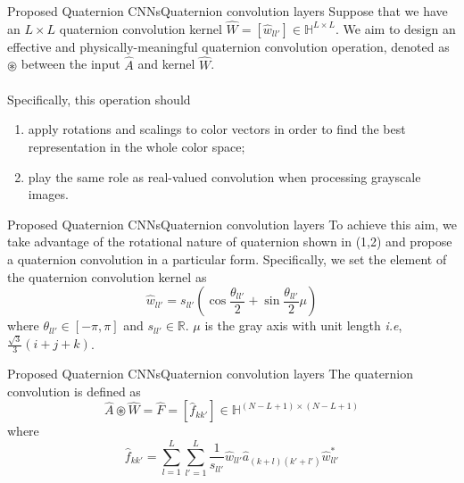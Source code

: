 \documentclass{beamer}
\begin{document}
\begin{frame}{Proposed Quaternion CNNs}{Quaternion convolution layers}
Suppose that we have an $L\times L$ quaternion convolution kernel $\hat{W}=[\hat{w}_{ll'}]\in \mathbb{H}^{L\times L}$. We aim to design an effective and physically-meaningful quaternion convolution operation, denoted as $\circledast$ between the input $\hat{A}$ and kernel $\hat{W}$.
\\~\\
Specifically, this operation should
\begin{enumerate}
    \item apply rotations and scalings to color vectors in order to find the best representation in the whole color space; 
    \item play the same role as real-valued convolution when processing grayscale images.
\end{enumerate}
\end{frame}

\begin{frame}{Proposed Quaternion CNNs}{Quaternion convolution layers}
To achieve this aim, we take advantage of the rotational nature of quaternion shown in (1,2) and propose a quaternion convolution in a particular form. Specifically, we set the element of the quaternion convolution kernel as
\begin{equation}
    \hat{w}_{ll'}=s_{ll'}(\cos\frac{\theta_{ll'}}{2}+\sin\frac{\theta_{ll'}}{2}\mu)
\end{equation}
where $\theta_{ll'}\in [-\pi,\pi]$ and $s_{ll'}\in \mathbb{R}$. $\mu$ is the gray axis with unit length \emph{i.e}, $\frac{\sqrt{3}}{3}(i+j+k)$.
\end{frame}

\begin{frame}{Proposed Quaternion CNNs}{Quaternion convolution layers}
    The quaternion convolution is defined as
    \begin{equation}
        \hat{A}\circledast \hat{W} =\hat{F}=[\hat{f}_{kk'}]\in \mathbb{H}^{(N-L+1)\times (N-L+1)}
    \end{equation}
    where 
    \begin{equation}
        \label{e6}
        \hat{f}_{kk'}=\sum_{l=1}^L\sum_{l'=1}^L \frac{1}{s_{ll'}}\hat{w}_{ll'}\hat{a}_{(k+l)(k'+l')}\hat{w}^*_{ll'}
    \end{equation}
\end{frame}
\end{document}

